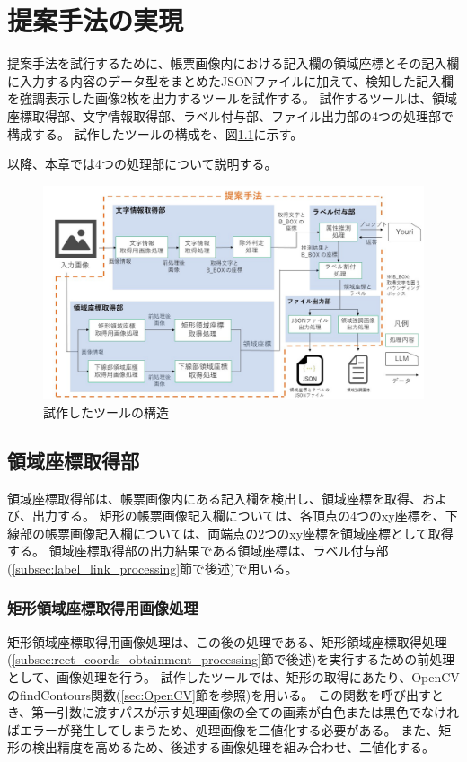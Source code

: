 \chapter{提案手法の実現}\label{cha:Implementation}
提案手法を試行するために、帳票画像内における記入欄の領域座標とその記入欄に入力する内容のデータ型をまとめたJSONファイルに加えて、検知した記入欄を強調表示した画像2枚を出力するツールを試作する。
試作するツールは、領域座標取得部、文字情報取得部、ラベル付与部、ファイル出力部の4つの処理部で構成する。
試作したツールの構成を、図\ref{fig:structure}に示す。

以降、本章では4つの処理部について説明する。

\begin{figure}[t]
    \begin{center}
        \includegraphics[width=15cm]{image/04-implementation/structure.jpg}
        \caption{試作したツールの構造}
        \label{fig:structure}
    \end{center}
\end{figure}


\section{領域座標取得部}\label{sec:area_coords_obtainment_part}
領域座標取得部は、帳票画像内にある記入欄を検出し、領域座標を取得、および、出力する。
矩形の帳票画像記入欄については、各頂点の4つのxy座標を、下線部の帳票画像記入欄については、両端点の2つのxy座標を領域座標として取得する。
領域座標取得部の出力結果である領域座標は、ラベル付与部(\ref{subsec:label_link_processing}節で後述)で用いる。

\subsection{矩形領域座標取得用画像処理}\label{subsec:image_processing_for_rect_coords_obtainment}
矩形領域座標取得用画像処理は、この後の処理である、矩形領域座標取得処理(\ref{subsec:rect_coords_obtainment_processing}節で後述)を実行するための前処理として、画像処理を行う。
試作したツールでは、矩形の取得にあたり、OpenCVのfindContours関数(\ref{sec:OpenCV}節を参照)を用いる。
この関数を呼び出すとき、第一引数に渡すパスが示す処理画像の全ての画素が白色または黒色でなければエラーが発生してしまうため、処理画像を二値化する必要がある。
また、矩形の検出精度を高めるため、後述する画像処理を組み合わせ、二値化する。

